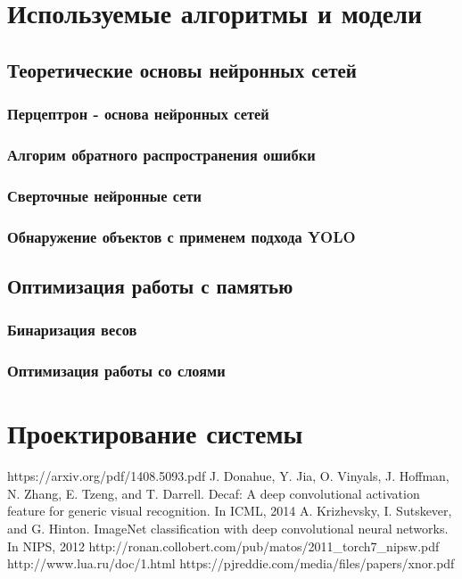 \documentclass[a4paper,english,russian]{G2-105}
\begin{document}
\chapter{Используемые алгоритмы и модели}
\section{Теоретические основы нейронных сетей}
\subsection{Перцептрон - основа нейронных сетей}
\subsection{Алгорим обратного распространения ошибки}
\subsection{Сверточные нейронные сети}
\subsection{Обнаружение объектов с применем подхода YOLO}
\section{Оптимизация работы с памятью}
\subsection{Бинаризация весов}
\subsection{Оптимизация работы со слоями}
\chapter{Проектирование системы}


\newpage
{}
\newpage
\begin{thebibliography}{1}
     https://arxiv.org/pdf/1408.5093.pdf
     J. Donahue, Y. Jia, O. Vinyals, J. Hoffman, N. Zhang, 
E. Tzeng, and T. Darrell. Decaf: A deep convolutional
activation feature for generic visual recognition. In ICML,
2014
  	  A. Krizhevsky, I. Sutskever, and G. Hinton. ImageNet
classification with deep convolutional neural networks. In
NIPS, 2012
	 http://ronan.collobert.com/pub/matos/2011\_torch7\_nipsw.pdf
	 http://www.lua.ru/doc/1.html
	 https://pjreddie.com/media/files/papers/xnor.pdf
\end{thebibliography}


\end{document}
